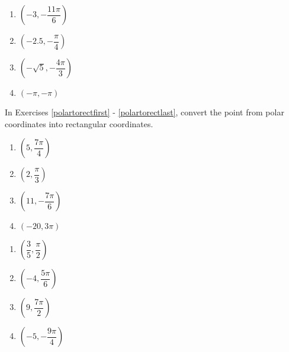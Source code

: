 \begin{multicols}{4} 

\begin{enumerate}

\setcounter{enumi}{\value{HW}}

\item $\left( -3, -\dfrac{11\pi}{6} \right)$
\item $\left( -2.5, -\dfrac{\pi}{4} \right)$ 
\item $\left( -\sqrt{5}, -\dfrac{4\pi}{3} \right)$
\item $\left( -\pi, -\pi \right)$  \label{polarpointgraphlast}

\setcounter{HW}{\value{enumi}}

\end{enumerate}

\end{multicols}

In Exercises \ref{polartorectfirst} - \ref{polartorectlast}, convert the point from polar coordinates into rectangular coordinates.  

\begin{multicols}{4}

\begin{enumerate}

\setcounter{enumi}{\value{HW}}

\item $\left( 5, \dfrac{7\pi}{4} \right)$ \label{polartorectfirst} 
\item $\left( 2, \dfrac{\pi}{3} \right)$ 
\item $\left( 11, -\dfrac{7\pi}{6} \right)$
\item $\left( -20, 3\pi \right)$ 

\setcounter{HW}{\value{enumi}}

\end{enumerate}

\end{multicols}

\begin{multicols}{4} 

\begin{enumerate}

\setcounter{enumi}{\value{HW}}

\item $\left( \dfrac{3}{5}, \dfrac{\pi}{2} \right)$
\item $\left( -4, \dfrac{5\pi}{6} \right)$
\item $\left( 9, \dfrac{7\pi}{2} \right)$
\item $\left( -5, -\dfrac{9\pi}{4} \right)$

\setcounter{HW}{\value{enumi}}

\end{enumerate}

\end{multicols}


